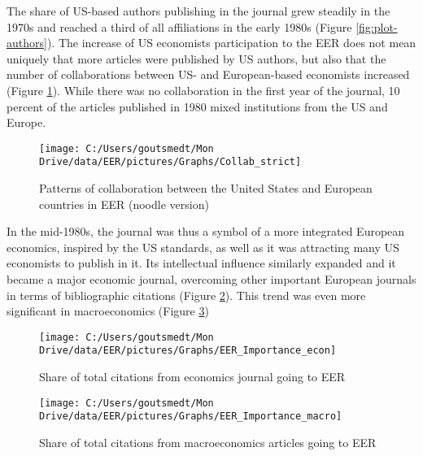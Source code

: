 \documentclass[]{elsarticle} %
\begin{document}
The share of US-based authors publishing in the journal grew steadily in
the 1970s and reached a third of all affiliations in the early 1980s
(Figure \ref{fig:plot-authors}). The increase of US economists
participation to the EER does not mean uniquely that more articles were
published by US authors, but also that the number of collaborations
between US- and European-based economists increased (Figure
\ref{fig:plot-collabs}). While there was no collaboration in the first
year of the journal, 10 percent of the articles published in 1980 mixed
institutions from the US and Europe.

\begin{figure}[h]

{\centering \texttt{[image: C:/Users/goutsmedt/Mon Drive/data/EER/pictures/Graphs/Collab\_strict]} 

}

\caption{Patterns of collaboration between the United States and European countries in EER (noodle version)}\label{fig:plot-collabs}
\end{figure}

In the mid-1980s, the journal was thus a symbol of a more integrated
European economics, inspired by the US standards, as well as it was
attracting many US economists to publish in it. Its intellectual
influence similarly expanded and it became a major economic journal,
overcoming other important European journals in terms of bibliographic
citations (Figure \ref{fig:plot-eer-importance}). This trend was even
more significant in macroeconomics (Figure
\ref{fig:plot-eer-importance-macro})

\begin{figure}[h]

{\centering \texttt{[image: C:/Users/goutsmedt/Mon Drive/data/EER/pictures/Graphs/EER\_Importance\_econ]} 

}

\caption{Share of total citations from economics journal going to EER}\label{fig:plot-eer-importance}
\end{figure}

\begin{figure}[h]

{\centering \texttt{[image: C:/Users/goutsmedt/Mon Drive/data/EER/pictures/Graphs/EER\_Importance\_macro]} 

}

\caption{Share of total citations from macroeconomics articles going to EER}\label{fig:plot-eer-importance-macro}
\end{figure}
\end{document}
